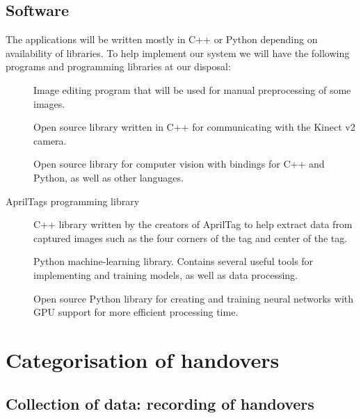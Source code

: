 \subsection*{Software}

The applications will be written mostly in C++ or Python depending on availability of libraries. To help implement our system we will have the following programs and programming libraries at our disposal:

\begin{description}
	\item[\textcite{GIMP}] Image editing program that will be used for manual preprocessing of some images.

	\item[\textcite{libfreenect2}] Open source library written in C++ for communicating with the Kinect v2 camera.

	\item[\textcite{OpenCV}] Open source library for computer vision with bindings for C++ and Python, as well as other languages.

	\item[AprilTags programming library] C++ library written by the creators of AprilTag to help extract data from captured images such as the four corners of the tag and center of the tag.

	\item[\textcite{scikitlearn}] Python machine-learning library. Contains several useful tools for implementing and training models, as well as data processing.

	\item[\textcite{Tensorflow}] Open source Python library for creating and training neural networks with GPU support for more efficient processing time.

\end{description}


\section{Categorisation of handovers}

\subsection{Collection of data: recording of handovers}

